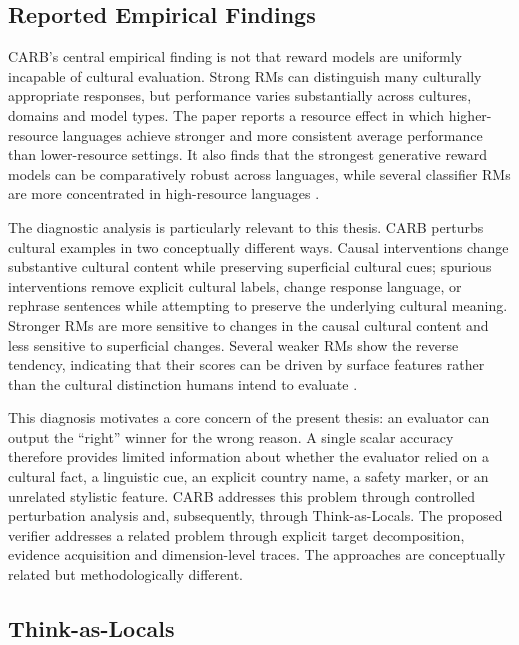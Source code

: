 \subsection{Reported Empirical Findings}

CARB's central empirical finding is not that reward models are uniformly incapable of cultural evaluation. Strong RMs can distinguish many culturally appropriate responses, but performance varies substantially across cultures, domains and model types. The paper reports a resource effect in which higher-resource languages achieve stronger and more consistent average performance than lower-resource settings. It also finds that the strongest generative reward models can be comparatively robust across languages, while several classifier RMs are more concentrated in high-resource languages \parencite{zhang2026carb}.

The diagnostic analysis is particularly relevant to this thesis. CARB perturbs cultural examples in two conceptually different ways. Causal interventions change substantive cultural content while preserving superficial cultural cues; spurious interventions remove explicit cultural labels, change response language, or rephrase sentences while attempting to preserve the underlying cultural meaning. Stronger RMs are more sensitive to changes in the causal cultural content and less sensitive to superficial changes. Several weaker RMs show the reverse tendency, indicating that their scores can be driven by surface features rather than the cultural distinction humans intend to evaluate \parencite{zhang2026carb}.

This diagnosis motivates a core concern of the present thesis: an evaluator can output the ``right'' winner for the wrong reason. A single scalar accuracy therefore provides limited information about whether the evaluator relied on a cultural fact, a linguistic cue, an explicit country name, a safety marker, or an unrelated stylistic feature. CARB addresses this problem through controlled perturbation analysis and, subsequently, through Think-as-Locals. The proposed verifier addresses a related problem through explicit target decomposition, evidence acquisition and dimension-level traces. The approaches are conceptually related but methodologically different.

\subsection{Think-as-Locals}
\label{sec:think-as-locals}

